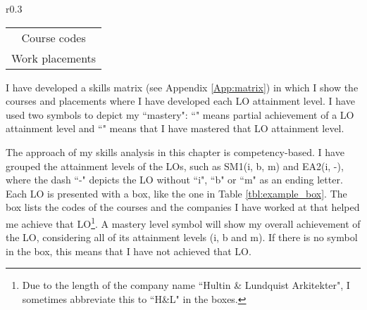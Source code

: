 \begin{wraptable}[5]{r}{0.3\textwidth}
	\centering
	\caption{Example box}
	\label{tbl:example_box}
	\begin{tabular}{|c|}
			\hline
			\rowcolor[HTML]{F8A102} 
			\multicolumn{1}{|c|}{\cellcolor[HTML]{F8A102}\textbf{LO(i, b, m) \nomaster / \master}} \\ \hline
			Course codes \\
			Work placements \\ \hline
	\end{tabular}
\end{wraptable}

I have developed a skills matrix (see Appendix \ref{App:matrix}) in which I show the courses and placements where I have developed each LO attainment level.
I have used two symbols to depict my ``mastery":
``\nomaster" means partial achievement of a LO attainment level and 
``\master" means that I have mastered that LO attainment level.

The approach of my skills analysis in this chapter is competency-based.
I have grouped the attainment levels of the LOs, such as SM1(i, b, m) and EA2(i, -), where the dash ``-" depicts the LO without ``i", ``b" or ``m" as an ending letter.
Each LO is presented with a box, like the one in Table \ref{tbl:example_box}.
The box lists the codes of the courses and the companies I have worked at that helped me achieve that LO\footnote{
Due to the length of the company name ``Hultin \& Lundquist Arkitekter", I sometimes abbreviate this to ``H\&L" in the boxes.}.
A mastery level symbol will show my overall achievement of the LO, considering all of its attainment levels (i, b and m).
If there is no symbol in the box, this means that I have not achieved that LO.

